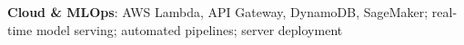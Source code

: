 \item \textbf{Cloud \& MLOps}: AWS Lambda, API Gateway, DynamoDB, SageMaker; real-time model serving; automated pipelines; server deployment
